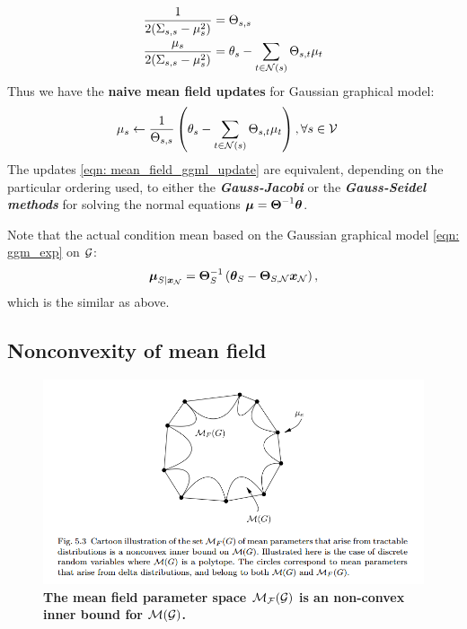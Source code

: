 \documentclass[11pt]{article}
\begin{document}
\begin{itemize}
\begin{align}
\frac{1}{2(\Sigma_{s,s}  - \mu_{s}^2) } &= \Theta_{s,s} \label{eqn: mean_field_ggm_precision_covariance}\\
\frac{\mu_{s}}{2(\Sigma_{s,s}  - \mu_{s}^2) } &= \theta_{s} - \sum_{t\in {\mathcal N}(s)}\Theta_{s,t}\mu_{t} \nonumber
\end{align} Thus we have the \textbf{naive mean field updates} for Gaussian graphical model:
\begin{align}
\mu_{s} &\leftarrow \frac{1}{\Theta_{s,s}}\left( \theta_{s} - \sum_{t\in {\mathcal N}(s)}\Theta_{s,t}\mu_{t}\right), \forall s\in {\mathcal V} \label{eqn: mean_field_ggml_update}
\end{align} The updates \eqref{eqn: mean_field_ggml_update} are equivalent, depending on the particular ordering used, to either the \emph{\textbf{Gauss-Jacobi}} or the \emph{\textbf{Gauss-Seidel methods}} \citep{golub2013matrix} for solving the normal equations $\boldsymbol{\mu} = \boldsymbol{\Theta}^{-1}\boldsymbol{\theta}$.

Note that the actual condition mean based on the Gaussian graphical model \eqref{eqn: ggm_exp} on ${\mathcal G}$:
\begin{align*}
\boldsymbol{\mu}_{S|\boldsymbol{x}_{{\mathcal N}}} = \boldsymbol{\Theta}_{S}^{-1}\left(\boldsymbol{\theta}_{S} -  \boldsymbol{\Theta}_{S, {\mathcal N}}\boldsymbol{x}_{{\mathcal N}}\right),
\end{align*} which is the similar as above.
\end{itemize}


\subsection{Nonconvexity of mean field}
\begin{figure}
\begin{minipage}[t]{1\linewidth}
  \centering
  \centerline{\includegraphics[scale = 0.45]{mean_field_region.png}}
\end{minipage}
\caption{\footnotesize{\textbf{The mean field parameter space ${\mathcal M}_{{\mathcal F}}({\mathcal G})$ is an non-convex inner bound for ${\mathcal M}({\mathcal G})$.}}}
\label{fig: mean_field_region}
\end{figure}
\end{document}
